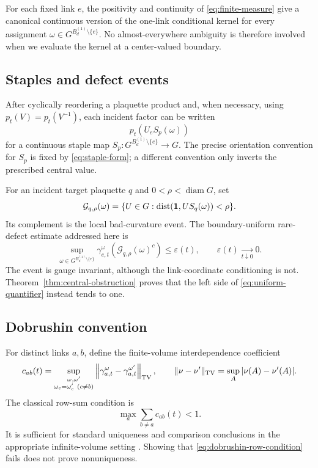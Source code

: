 For each fixed link $e$, the positivity and continuity of
\eqref{eq:finite-measure} give a canonical continuous version of the
one-link conditional kernel for every assignment
$\omega\in G^{B_d^{(1)}\setminus\{e\}}$.  No almost-everywhere ambiguity is
therefore involved when we evaluate the kernel at a center-valued boundary.

\subsection{Staples and defect events}

After cyclically reordering a plaquette product and, when necessary, using
$p_t(V)=p_t(V^{-1})$, each incident factor can be written
\begin{equation}\label{eq:staple-form}
  p_t(U_e S_p(\omega))
\end{equation}
for a continuous staple map
$S_p:G^{B_d^{(1)}\setminus\{e\}}\to G$.  The precise orientation convention
for $S_p$ is fixed by \eqref{eq:staple-form}; a different convention only
inverts the prescribed central value.

For an incident target plaquette $q$ and $0<\rho<\operatorname{diam}G$, set
\begin{equation}\label{eq:good-event}
 \mathcal G_{q,\rho}(\omega)
 =\{U\in G:\operatorname{dist}(\mathbf 1,U S_q(\omega))<\rho\}.
\end{equation}
Its complement is the local bad-curvature event.  The boundary-uniform
rare-defect estimate addressed here is
\begin{equation}\label{eq:uniform-quantifier}
 \sup_{\omega\in G^{B_d^{(1)}\setminus\{e\}}}
 \gamma_{e,t}^{\omega}(\mathcal G_{q,\rho}(\omega)^c)
 \leq \varepsilon(t),
 \qquad \varepsilon(t)\xrightarrow[t\downarrow0]{}0.
\end{equation}
The event is gauge invariant, although the link-coordinate conditioning is
not.  Theorem~\ref{thm:central-obstruction} proves that the left side of
\eqref{eq:uniform-quantifier} instead tends to one.

\subsection{Dobrushin convention}

For distinct links $a,b$, define the finite-volume interdependence
coefficient
\begin{equation}\label{eq:dobrushin-coefficient}
 c_{ab}(t)=
 \sup_{\substack{\omega,\omega'\\
                  \omega_c=\omega'_c\ (c\neq b)}}
 \left\|\gamma_{a,t}^{\omega}-\gamma_{a,t}^{\omega'}\right\|_{\mathrm{TV}},
 \qquad
 \|\nu-\nu'\|_{\mathrm{TV}}=\sup_A|\nu(A)-\nu'(A)|.
\end{equation}
The classical row-sum condition is
\begin{equation}\label{eq:dobrushin-row-condition}
  \max_a\sum_{b\neq a}c_{ab}(t)<1.
\end{equation}
It is sufficient for standard uniqueness and comparison conclusions in the
appropriate infinite-volume setting \cite{Dobrushin1968}.  Showing that
\eqref{eq:dobrushin-row-condition} fails does not prove nonuniqueness.

